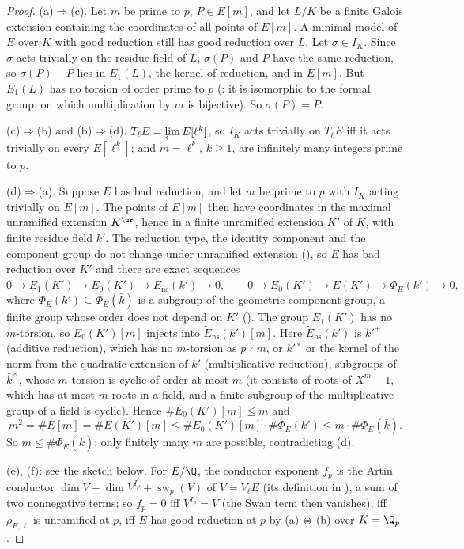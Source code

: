 \begin{proof}
(a)$\Rightarrow$(c). Let $m$ be prime to $p$, $P\in E[m]$, and let $L/K$ be a finite Galois extension containing the coordinates of all points of
$E[m]$. A minimal model of $E$ over $K$ with good reduction still has good reduction over $L$. Let $\sigma\in I_K$. Since $\sigma$ acts trivially on
the residue field of $L$, $\sigma(P)$ and $P$ have the same reduction, so $\sigma(P)-P$ lies in $E_1(L)$, the kernel of reduction, and in $E[m]$. But
$E_1(L)$ has no torsion of order prime to $p$ (: it is isomorphic to the formal group, on which multiplication by $m$ is
bijective). So $\sigma(P)=P$.

(c)$\Rightarrow$(b) and (b)$\Rightarrow$(d). $T_\ell E=\varprojlim E[\ell^k]$, so $I_K$ acts trivially on $T_\ell E$ iff it acts trivially on every $E[\ell^k]$; and
$m=\ell^k$, $k\ge1$, are infinitely many integers prime to $p$.

(d)$\Rightarrow$(a). Suppose $E$ has bad reduction, and let $m$ be prime to $p$ with $I_K$ acting trivially on $E[m]$. The points of $E[m]$ then have
coordinates in the maximal unramified extension $K^{\ur}$, hence in a finite unramified extension $K'$ of $K$, with finite residue field $k'$.
The reduction type, the identity component and the component group do not change under unramified extension (), so
$E$ has bad reduction over $K'$ and there are exact sequences
\[
0\to E_1(K')\to E_0(K')\to\tilde E_{\mathrm{ns}}(k')\to0,\qquad 0\to E_0(K')\to E(K')\to\Phi_E(k')\to0,
\]
where $\Phi_E(k')\subseteq\Phi_E(\bar k)$ is a subgroup of the geometric component group, a finite group whose order does not depend on $K'$
(). The group $E_1(K')$ has no $m$-torsion, so $E_0(K')[m]$ injects into $\tilde E_{\mathrm{ns}}(k')[m]$. Here $\tilde E_{\mathrm{ns}}(k')$ is
$k'^+$ (additive reduction), which has no $m$-torsion as $p\nmid m$, or $k'^\times$ or the kernel of the norm from the quadratic extension of $k'$
(multiplicative reduction), subgroups of $\bar k^\times$, whose $m$-torsion is cyclic of order at most $m$ (it consists of roots of $X^m-1$, which has at
most $m$ roots in a field, and a finite subgroup of the multiplicative group of a field is cyclic). Hence $\#E_0(K')[m]\le m$ and
\[
m^2=\#E[m]=\#E(K')[m]\le\#E_0(K')[m]\cdot\#\Phi_E(k')\le m\cdot\#\Phi_E(\bar k) .
\]
So $m\le\#\Phi_E(\bar k)$: only finitely many $m$ are possible, contradicting (d).

(e), (f): see the sketch below. For $E/\Q$, the conductor exponent $f_p$ is the Artin conductor $\dim V-\dim V^{I_p}+\operatorname{sw}_p(V)$ of $V=V_\ell E$
(its definition in ), a sum of two nonnegative terms; so $f_p=0$ iff $V^{I_p}=V$ (the Swan term then vanishes), iff $\rho_{E,\ell}$ is
unramified at $p$, iff $E$ has good reduction at $p$ by (a)$\Leftrightarrow$(b) over $K=\Q_p$.
\end{proof}

